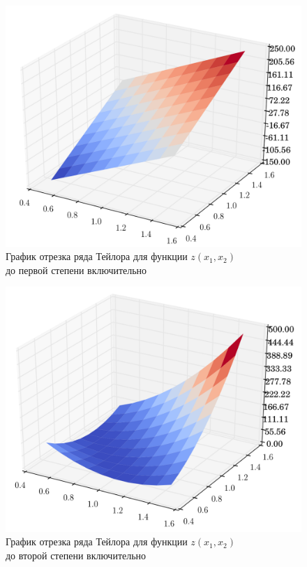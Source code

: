 \begin{figure}[h!]
  \centering
  \includegraphics[width=0.71\linewidth]{pic/taylor_2_1}
  \caption{График отрезка ряда Тейлора для функции $z(x_1, x_2)$ \\ до первой степени включительно}
\end{figure}

\begin{figure}[h!]
  \centering
  \includegraphics[width=0.71\linewidth]{pic/taylor_2_2}
  \caption{График отрезка ряда Тейлора для функции $z(x_1, x_2)$ \\ до второй степени включительно}
\end{figure}

\newpage

